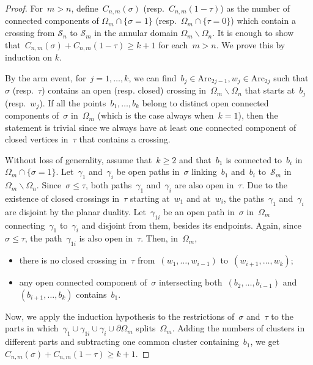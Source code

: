 \documentclass[11pt,letterpaper]{amsart}
\newcounter{n}
\numberwithin{n}{section}
\theoremstyle{plain}
\theoremstyle{definition}
\theoremstyle{remark}
\renewcommand\setminus\smallsetminus
\newcommand\calS{\mathcal S}
\newcommand\domain\Omega
\newcommand{\1}{\mathbbm{1}}
\begin{document}
\begin{proof} 
	For~$m>n$, define~$C_{n,m}(\sigma)$ (resp.~$C_{n,m}(1-\tau)$) as the number of connected components of $\domain_m \cap \{\sigma=1\}$ (resp.~$\domain_m \cap \{\tau=0\}$) which contain a crossing from $\calS_n$ to $\calS_m$ in the annular domain $\domain_m \setminus \domain_n$.
	It is enough to show that~$C_{n,m}(\sigma) + C_{n,m}(1-\tau) \geq k+1$ for each~$m>n$.
	We prove this by induction on $k$.
	
	By the arm event, for~$j=1,\dots, k$, we can find~$b_j\in \mathrm{Arc}_{2j-1},w_j\in \mathrm{Arc}_{2j}$ such that~$\sigma$ (resp.~$\tau$) contains an open (resp. closed) crossing in~$\domain_m \setminus \domain_n$ that starts at~$b_j$ (resp.~$w_j$).
	If all the points~$b_1,\dots,b_k$ belong to distinct open connected components of~$\sigma$ in~$\domain_m$ (which is the case always when~$k=1$), then the statement is trivial since we always have at least one connected component of closed vertices in~$\tau$ that contains a crossing.
	
	Without loss of generality, assume that~$k\geq 2$ and that~$b_1$ is connected to~$b_i$ in~$\domain_m\cap \{\sigma=1\}$.
	Let~$\gamma_1$ and~$\gamma_i$ be open paths in~$\sigma$ linking~$b_1$ and~$b_i$ to~$\calS_m$ in~$\domain_m\setminus \domain_n$.
	Since~$\sigma\leq \tau$, both paths~$\gamma_1$ and~$\gamma_i$ are also open in~$\tau$.
	Due to the existence of closed crossings in~$\tau$ starting at~$w_1$ and at~$w_i$, the paths~$\gamma_1$ and~$\gamma_i$ are disjoint by the planar duality.
	Let~$\gamma_{1i}$ be an open path in~$\sigma$ in~$\domain_m$ connecting~$\gamma_1$ to~$\gamma_i$ and disjoint from them, besides its endpoints.
	Again, since~$\sigma\leq \tau$, the path~$\gamma_{1i}$ is also open in~$\tau$.
	Then, in~$\domain_m$,
	\begin{itemize}
		\item there is no closed crossing in~$\tau$ from~$(w_1,\dots,w_{i-1})$ to~$(w_{i+1},\dots,w_k)$;
		\item any open connected component of~$\sigma$ intersecting both~$(b_2,\dots,b_{i-1})$ and~$(b_{i+1},\dots,b_k)$ contains~$b_1$.
	\end{itemize}
	Now, we apply the induction hypothesis to the restrictions of~$\sigma$ and~$\tau$ to the parts in which~$\gamma_1\cup \gamma_{1i}\cup\gamma_i\cup \partial \domain_m$ splits~$\domain_m$.
	Adding the numbers of clusters in different parts and subtracting one common cluster containing~$b_1$, we get~$C_{n,m}(\sigma) + C_{n,m}(1-\tau) \geq k+1$.
\end{proof}
\end{document}
